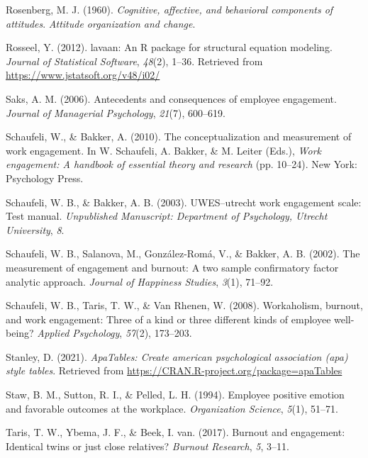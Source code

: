 \documentclass[
  english,
  man]{apa6}
\begin{document}
\leavevmode\hypertarget{ref-rosenberg_cognitive_1960}{}%
Rosenberg, M. J. (1960). \emph{Cognitive, affective, and behavioral components of attitudes}. \emph{Attitude organization and change}.

\leavevmode\hypertarget{ref-R-lavaan}{}%
Rosseel, Y. (2012). lavaan: An R package for structural equation modeling. \emph{Journal of Statistical Software}, \emph{48}(2), 1--36. Retrieved from \url{https://www.jstatsoft.org/v48/i02/}

\leavevmode\hypertarget{ref-saks2006antecedents}{}%
Saks, A. M. (2006). Antecedents and consequences of employee engagement. \emph{Journal of Managerial Psychology}, \emph{21}(7), 600--619.

\leavevmode\hypertarget{ref-schaufeli_conceptualization_2010}{}%
Schaufeli, W., \& Bakker, A. (2010). The conceptualization and measurement of work engagement. In W. Schaufeli, A. Bakker, \& M. Leiter (Eds.), \emph{Work engagement: A handbook of essential theory and research} (pp. 10--24). New York: Psychology Press.

\leavevmode\hypertarget{ref-schaufeli_uwesutrecht_2003}{}%
Schaufeli, W. B., \& Bakker, A. B. (2003). UWES--utrecht work engagement scale: Test manual. \emph{Unpublished Manuscript: Department of Psychology, Utrecht University}, \emph{8}.

\leavevmode\hypertarget{ref-schaufeli_measurement_2002}{}%
Schaufeli, W. B., Salanova, M., González-Romá, V., \& Bakker, A. B. (2002). The measurement of engagement and burnout: A two sample confirmatory factor analytic approach. \emph{Journal of Happiness Studies}, \emph{3}(1), 71--92.

\leavevmode\hypertarget{ref-schaufeli2008workaholism}{}%
Schaufeli, W. B., Taris, T. W., \& Van Rhenen, W. (2008). Workaholism, burnout, and work engagement: Three of a kind or three different kinds of employee well-being? \emph{Applied Psychology}, \emph{57}(2), 173--203.

\leavevmode\hypertarget{ref-R-apaTables}{}%
Stanley, D. (2021). \emph{ApaTables: Create american psychological association (apa) style tables}. Retrieved from \url{https://CRAN.R-project.org/package=apaTables}

\leavevmode\hypertarget{ref-staw_employee_1994}{}%
Staw, B. M., Sutton, R. I., \& Pelled, L. H. (1994). Employee positive emotion and favorable outcomes at the workplace. \emph{Organization Science}, \emph{5}(1), 51--71.

\leavevmode\hypertarget{ref-taris2017burnout}{}%
Taris, T. W., Ybema, J. F., \& Beek, I. van. (2017). Burnout and engagement: Identical twins or just close relatives? \emph{Burnout Research}, \emph{5}, 3--11.
\end{document}

